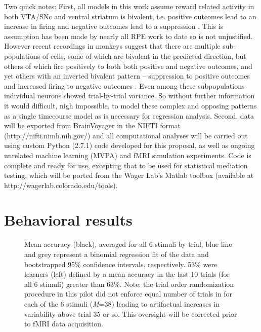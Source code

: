 \documentclass[doc,12pt]{apa}        %
\begin{document}
Two quick notes: First, all models in this work assume reward related activity in both VTA/SNc and ventral striatum is bivalent, i.e. positive outcomes lead to an increase in firing and negative outcomes lead to a suppression \cite{DArdenne:2008p1505,Cooper:2008p5238,Menon:2007p6529}.  This is assumption has been made by nearly all RPE work to date so is not unjustified.  However recent recordings in monkeys suggest that there are multiple sub-populations of cells, some of which are bivalent in the predicted direction, but others of which fire positively to both both positive and negative outcomes, and yet others with an inverted bivalent pattern -- suppression to positive outcomes and increased firing to negative outcomes \cite{Matsumoto:2009p7219,Levita:2009p7280}.  Even among these subpopulations individual neurons showed trial-by-trial variance.  So without further information it would difficult, nigh impossible, to model these complex and opposing patterns as a single timecourse model as is necessary for regression analysis.  Second, data will be exported from BrainVoyager in the NIFTI format (http://nifti.nimh.nih.gov/) and all computational analyses will be carried out using custom Python (2.7.1) code developed for this proposal, as well as ongoing unrelated machine learning (MVPA) and fMRI simulation experiments.  Code is complete and ready for use, excepting that to be used for statistical mediation testing, which will be ported from the Wager Lab's Matlab toolbox (available at http://wagerlab.colorado.edu/tools).

\section{Behavioral results} %
\label{sec:behavioral_results}

\begin{figure}[tp]
	\label{fig:acc}
	\caption{Mean accuracy (black), averaged for all 6 stimuli by trial, blue line and grey represent a binomial regression fit of the data and bootstrapped 95\% confidence intervals, respectively.  53\% were learners (left) defined by a mean accuracy in the last 10 trials (for all 6 stimuli) greater than 63\%. Note: the trial order randomization procedure in this pilot did not enforce equal number of trials in for each of the 6 stimuli (\emph{M}=38) leading to artifactual increases in variability above trial 35 or so.  This oversight will be corrected prior to fMRI data acquisition.}
\end{figure}
\end{document}
